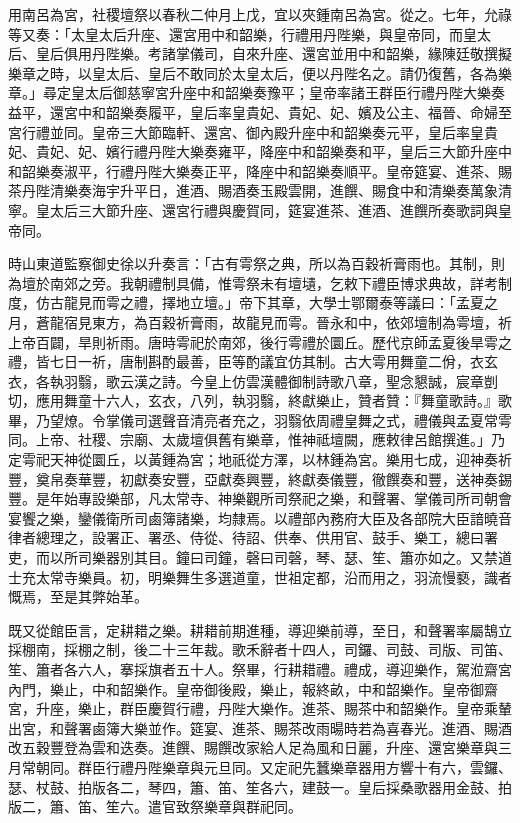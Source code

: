 \begin{pinyinscope}
用南呂為宮，社稷壇祭以春秋二仲月上戊，宜以夾鍾南呂為宮。從之。七年，允祿等又奏：「太皇太后升座、還宮用中和韶樂，行禮用丹陛樂，與皇帝同，而皇太后、皇后俱用丹陛樂。考諸掌儀司，自來升座、還宮並用中和韶樂，緣陳廷敬撰擬樂章之時，以皇太后、皇后不敢同於太皇太后，便以丹陛名之。請仍復舊，各為樂章。」尋定皇太后御慈寧宮升座中和韶樂奏豫平；皇帝率諸王群臣行禮丹陛大樂奏益平，還宮中和韶樂奏履平，皇后率皇貴妃、貴妃、妃、嬪及公主、福晉、命婦至宮行禮並同。皇帝三大節臨軒、還宮、御內殿升座中和韶樂奏元平，皇后率皇貴妃、貴妃、妃、嬪行禮丹陛大樂奏雍平，降座中和韶樂奏和平，皇后三大節升座中和韶樂奏淑平，行禮丹陛大樂奏正平，降座中和韶樂奏順平。皇帝筵宴、進茶、賜茶丹陛清樂奏海宇升平日，進酒、賜酒奏玉殿雲開，進饌、賜食中和清樂奏萬象清寧。皇太后三大節升座、還宮行禮與慶賀同，筵宴進茶、進酒、進饌所奏歌詞與皇帝同。

時山東道監察御史徐以升奏言：「古有雩祭之典，所以為百穀祈膏雨也。其制，則為壇於南郊之旁。我朝禮制具備，惟雩祭未有壇壝，乞敕下禮臣博求典故，詳考制度，仿古龍見而雩之禮，擇地立壇。」帝下其章，大學士鄂爾泰等議曰：「孟夏之月，蒼龍宿見東方，為百穀祈膏雨，故龍見而雩。晉永和中，依郊壇制為雩壇，祈上帝百闢，旱則祈雨。唐時雩祀於南郊，後行雩禮於圜丘。歷代京師孟夏後旱雩之禮，皆七日一祈，唐制斟酌最善，臣等酌議宜仿其制。古大雩用舞童二佾，衣玄衣，各執羽翳，歌云漢之詩。今皇上仿雲漢體御制詩歌八章，聖念懇誠，宸章剴切，應用舞童十六人，玄衣，八列，執羽翳，終獻樂止，贊者贊：『舞童歌詩。』歌畢，乃望燎。令掌儀司選聲音清亮者充之，羽翳依周禮皇舞之式，禮儀與孟夏常雩同。上帝、社稷、宗廟、太歲壇俱舊有樂章，惟神祗壇闕，應敕律呂館撰進。」乃定雩祀天神從圜丘，以黃鍾為宮；地祇從方澤，以林鍾為宮。樂用七成，迎神奏祈豐，奠帛奏華豐，初獻奏安豐，亞獻奏興豐，終獻奏儀豐，徹饌奏和豐，送神奏錫豐。是年始專設樂部，凡太常寺、神樂觀所司祭祀之樂，和聲署、掌儀司所司朝會宴饗之樂，鑾儀衛所司鹵簿諸樂，均隸焉。以禮部內務府大臣及各部院大臣諳曉音律者總理之，設署正、署丞、侍從、待詔、供奉、供用官、鼓手、樂工，總曰署吏，而以所司樂器別其目。鐘曰司鐘，磬曰司磬，琴、瑟、笙、簫亦如之。又禁道士充太常寺樂員。初，明樂舞生多選道童，世祖定都，沿而用之，羽流慢褻，識者慨焉，至是其弊始革。

既又從館臣言，定耕耤之樂。耕耤前期進種，導迎樂前導，至日，和聲署率屬鵠立採棚南，採棚之制，後二十三年裁。歌禾辭者十四人，司鑼、司鼓、司版、司笛、笙、簫者各六人，搴採旗者五十人。祭畢，行耕耤禮。禮成，導迎樂作，駕涖齋宮內門，樂止，中和韶樂作。皇帝御後殿，樂止，報終畝，中和韶樂作。皇帝御齋宮，升座，樂止，群臣慶賀行禮，丹陛大樂作。進茶、賜茶中和韶樂作。皇帝乘輦出宮，和聲署鹵簿大樂並作。筵宴、進茶、賜茶改雨暘時若為喜春光。進酒、賜酒改五穀豐登為雲和迭奏。進饌、賜饌改家給人足為風和日麗，升座、還宮樂章與三月常朝同。群臣行禮丹陛樂章與元旦同。又定祀先蠶樂章器用方響十有六，雲鑼、瑟、杖鼓、拍版各二，琴四，簫、笛、笙各六，建鼓一。皇后採桑歌器用金鼓、拍版二，簫、笛、笙六。遣官致祭樂章與群祀同。


\end{pinyinscope}
